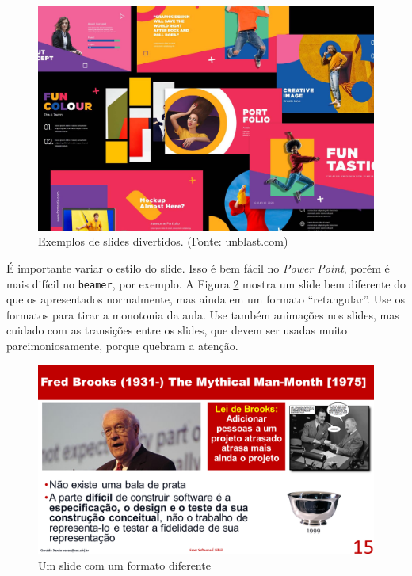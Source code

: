 \documentclass{article}
\def\tam{0.6}
\begin{document}
\begin{figure}[hbt]
    \centering
    \includegraphics[width=\tam\linewidth]{imagens/funslide.jpg}
    \caption{Exemplos de slides divertidos. 
    (Fonte: unblast.com) }
    \label{fig:fun}
\end{figure}


É importante variar o estilo do slide. Isso é bem fácil no \textit{Power Point}, porém é mais difícil no \texttt{beamer}, por exemplo. A Figura \ref{fig:man} mostra um slide bem diferente do que os apresentados normalmente, mas ainda em um formato ``retangular''. Use os formatos para tirar a monotonia da aula. Use também animações nos slides, mas cuidado com as transições entre os slides, que devem ser usadas muito parcimoniosamente, porque quebram a atenção.

\begin{figure}[htb]
    \centering
    \includegraphics[width=\tam\linewidth]{imagens/manmonth.png}
    \caption{Um slide com um formato diferente}
    \label{fig:man}
\end{figure}
\end{document}
